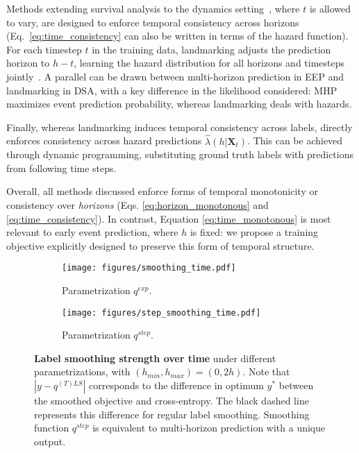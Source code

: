 \documentclass[nohyperref]{article}
\begin{document}
Methods extending survival analysis to the dynamics setting~\cite{van2007dynamic}, where $t$ is allowed to vary, are designed to enforce temporal consistency across horizons (Eq.~\ref{eq:time_consistency} can also be written in terms of the hazard function). 
For each timestep $t$ in the training data, landmarking adjusts the prediction horizon to $h-t$, learning the hazard distribution for all horizons and timesteps jointly~\cite{van2007dynamic, parast2014landmark}. A parallel can be drawn between multi-horizon prediction in EEP and landmarking in DSA, with a key difference in the likelihood considered: MHP maximizes event prediction probability, whereas landmarking deals with hazards.


Finally, whereas landmarking induces temporal consistency across labels, \citet{Maystre2022} directly enforces consistency across hazard predictions $\hat{\lambda}(h| \mathbf{X}_t)$. This can be achieved through dynamic programming, substituting ground truth labels with predictions from following time steps.






Overall, all methods discussed enforce forms of temporal monotonicity or consistency over \textit{horizons} (Eqs. \ref{eq:horizon_monotonous} and  \ref{eq:time_consistency}). In contrast, Equation \ref{eq:time_monotonous} is most relevant to early event prediction, where $h$ is fixed: we propose a training objective explicitly designed to preserve this form of temporal structure.
















\begin{figure*}[t]
    \centering
    \begin{subfigure}[b]{0.45\textwidth}
      \texttt{[image: figures/smoothing\_time.pdf]}\vspace{-0.5em}
      \caption{Parametrization $q^{exp}$.}
    \end{subfigure} \hspace{1em}
    \begin{subfigure}[b]{0.45\textwidth}
      \texttt{[image: figures/step\_smoothing\_time.pdf]}\vspace{-0.5em} \caption{Parametrization $q^{step}$.}\label{fig:smoothing_MHP} 
    \end{subfigure}
    \caption{\textbf{Label smoothing strength over time} under different parametrizations, with $(h_{min},h_{max})=(0,2h)$. Note that $|y-q^{(T)LS}|$ corresponds to the difference in optimum $y^*$ between the smoothed objective and cross-entropy. The black dashed line represents  this difference for regular label smoothing. Smoothing function $q^{step}$ is equivalent to multi-horizon prediction with a unique output.}
    \label{fig:smoothing_strength}
    \vspace{-1em}
\end{figure*}
\end{document}
